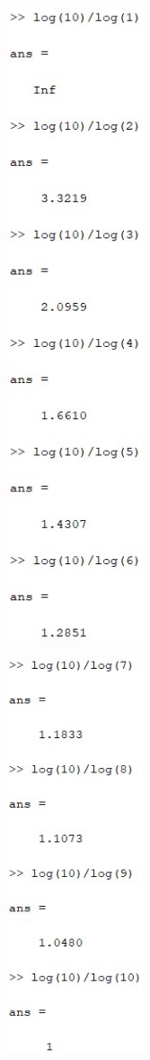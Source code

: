 \documentclass{article}
\begin{document}
\begin{enumerate}
    \begin{figure}[H]
    \centering
    \includegraphics[width=4cm]{img9a.jpg}
    \end{figure}
    \begin{figure}[H]
    \centering
    \includegraphics[width=4cm]{img9b.jpg}
    \end{figure}


\end{enumerate}
\end{document}
